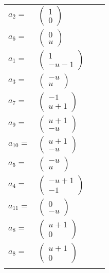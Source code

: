 \documentclass[1p]{elsarticle_modified}
\theoremstyle{definition}
\begin{document}
\begin{tabular}{m{7pt} m{180pt} m{7pt} m{180pt} }
\flushright $a_{2}=$&$\begin{pmatrix}1\\0\end{pmatrix}$ \\
\flushright $a_{6}=$&$\begin{pmatrix}0\\u\end{pmatrix}$ \\
\flushright $a_{1}=$&$\begin{pmatrix}1\\- u-1\end{pmatrix}$ \\
\flushright $a_{3}=$&$\begin{pmatrix}- u\\u\end{pmatrix}$ \\
\flushright $a_{7}=$&$\begin{pmatrix}-1\\u+1\end{pmatrix}$ \\
\flushright $a_{9}=$&$\begin{pmatrix}u+1\\- u\end{pmatrix}$ \\
\flushright $a_{10}=$&$\begin{pmatrix}u+1\\- u\end{pmatrix}$ \\
\flushright $a_{5}=$&$\begin{pmatrix}- u\\u\end{pmatrix}$ \\
\flushright $a_{4}=$&$\begin{pmatrix}- u+1\\-1\end{pmatrix}$ \\
\flushright $a_{11}=$&$\begin{pmatrix}0\\- u\end{pmatrix}$ \\
\flushright $a_{8}=$&$\begin{pmatrix}u+1\\0\end{pmatrix}$\\ \flushright $a_{8}=$&$\begin{pmatrix}u+1\\0\end{pmatrix}$\\&\end{tabular}
\end{document}
